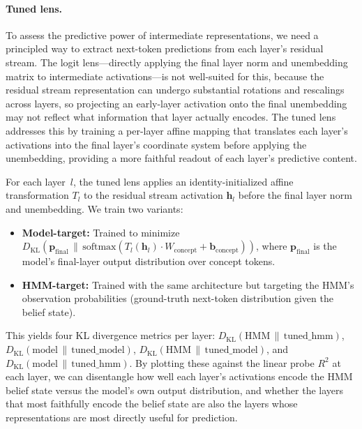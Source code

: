 \documentclass[midterm]{sparreport}
\begin{document}
\paragraph{Tuned lens.}
To assess the predictive power of intermediate representations, we need a principled way to extract next-token predictions from each layer's residual stream. The logit lens---directly applying the final layer norm and unembedding matrix to intermediate activations---is not well-suited for this, because the residual stream representation can undergo substantial rotations and rescalings across layers, so projecting an early-layer activation onto the final unembedding may not reflect what information that layer actually encodes. The tuned lens~\cite{tunedlens} addresses this by training a per-layer affine mapping that translates each layer's activations into the final layer's coordinate system before applying the unembedding, providing a more faithful readout of each layer's predictive content.

For each layer~$l$, the tuned lens applies an identity-initialized affine transformation $T_l$ to the residual stream activation $\mathbf{h}_l$ before the final layer norm and unembedding. We train two variants:
\begin{itemize}
  \item \textbf{Model-target:} Trained to minimize $D_{\mathrm{KL}}(\mathbf{p}_{\mathrm{final}} \,\|\, \mathrm{softmax}(T_l(\mathbf{h}_l) \cdot W_{\mathrm{concept}} + \mathbf{b}_{\mathrm{concept}}))$, where $\mathbf{p}_{\mathrm{final}}$ is the model's final-layer output distribution over concept tokens.
  \item \textbf{HMM-target:} Trained with the same architecture but targeting the HMM's observation probabilities (ground-truth next-token distribution given the belief state).
\end{itemize}
This yields four KL divergence metrics per layer: $D_{\mathrm{KL}}(\mathrm{HMM} \,\|\, \mathrm{tuned\_hmm})$, $D_{\mathrm{KL}}(\mathrm{model} \,\|\, \mathrm{tuned\_model})$, $D_{\mathrm{KL}}(\mathrm{HMM} \,\|\, \mathrm{tuned\_model})$, and $D_{\mathrm{KL}}(\mathrm{model} \,\|\, \mathrm{tuned\_hmm})$. By plotting these against the linear probe $R^2$ at each layer, we can disentangle how well each layer's activations encode the HMM belief state versus the model's own output distribution, and whether the layers that most faithfully encode the belief state are also the layers whose representations are most directly useful for prediction.
\end{document}
